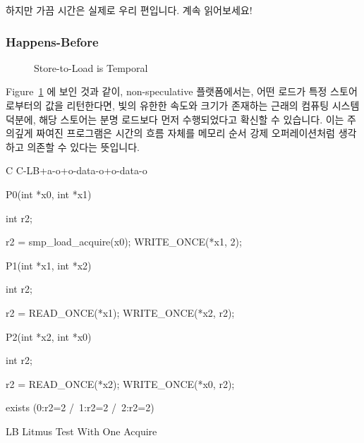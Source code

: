 하지만 가끔 시간은 실제로 우리 편입니다.  계속 읽어보세요!

\subsubsection{Happens-Before}
\label{sec:memorder:Happens-Before}

\begin{figure}[tbp]
\centering
{}
\caption{Store-to-Load is Temporal}
\label{fig:memorder:Store-to-Load is Temporal}
\end{figure}

Figure~\ref{fig:memorder:Store-to-Load is Temporal}
에 보인 것과 같이, non-speculative 플랫폼에서는, 어떤 로드가 특정 스토어
로부터의 값을 리턴한다면, 빛의 유한한 속도와 크기가 존재하는 근래의 컴퓨팅
시스템 덕분에, 해당 스토어는 분명 로드보다 먼저 수행되었다고 확신할 수
있습니다.
이는 주의깊게 짜여진 프로그램은 시간의 흐름 자체를 메모리 순서 강제
오퍼레이션처럼 생각하고 의존할 수 있다는 뜻입니다.

\begin{listing}[tbp]
{ \scriptsize
\begin{verbbox}[\LstLineNo]
C C-LB+a-o+o-data-o+o-data-o
{
}

P0(int *x0, int *x1)
{
  int r2;

  r2 = smp_load_acquire(x0);
  WRITE_ONCE(*x1, 2);
}


P1(int *x1, int *x2)
{
  int r2;

  r2 = READ_ONCE(*x1);
  WRITE_ONCE(*x2, r2);
}

P2(int *x2, int *x0)
{
  int r2;

  r2 = READ_ONCE(*x2);
  WRITE_ONCE(*x0, r2);
}

exists (0:r2=2 /\ 1:r2=2 /\ 2:r2=2)
\end{verbbox}
}
\centering
\theverbbox
\caption{LB Litmus Test With One Acquire}
\label{lst:memorder:LB Litmus Test With One Acquire}
\end{listing}

